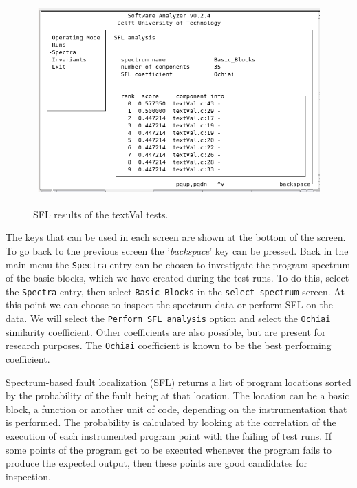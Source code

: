 	\begin{figure}[h!]
		\begin{center}
		\begin{tabular}{c}
			\includegraphics[scale=0.40]{sources/analyze_sfl.png} \\
		\end{tabular}
		\end{center}
		\caption{SFL results of the textVal tests.}
		\label{fig:analyzeSfl}
	\end{figure}
	
	The keys that can be used in each screen are shown at the bottom of the screen.
	To go back to the previous screen the '\emph{backspace}' key can be pressed.
	Back in the main menu the \verb|Spectra| entry can be chosen to investigate the
	program spectrum of the basic blocks, which we have created during the test runs.
	To do this, select the \verb|Spectra| entry, then select \verb|Basic Blocks| 
	in the \verb|select spectrum| screen.
	At this point we can choose to inspect the spectrum data 
	or perform SFL on the data.
	We will select the \verb|Perform SFL analysis| option and select the
	\verb|Ochiai| similarity coefficient.
	Other coefficients are also possible, but are present for research purposes.
	The \verb|Ochiai| coefficient is known to be the best performing coefficient.
	
	Spectrum-based fault localization (SFL) returns a list of program locations
	sorted by the probability of the fault being at that location.
	The location can be a basic block, a function or another unit of code,
	depending on the instrumentation that is performed.
	The probability is calculated by looking at the correlation of the execution of each instrumented
	program point with the failing of test runs.
	If some points of the program get to be executed whenever the program fails to produce the
	expected output, then these points are good candidates for inspection.
	
